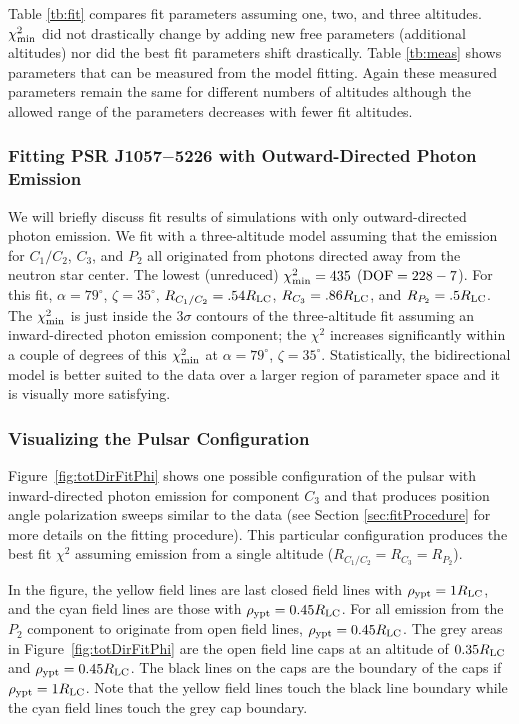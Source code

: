 Table \ref{tb:fit} compares fit parameters assuming one,
two, and three altitudes.  $\chi^2_{\rm{min}}$ did not drastically change
by adding new free parameters (additional altitudes) nor did
the best fit parameters shift drastically.  
Table \ref{tb:meas} shows parameters that can be measured
from the model fitting.  Again these measured parameters remain the
same for different numbers of altitudes although
the allowed range of the parameters decreases with
fewer fit altitudes.

\subsubsection{Fitting PSR J1057$-$5226 with Outward-Directed Photon Emission}
\label{sec:outwardOnly}
We will briefly discuss fit results of simulations with 
only outward-directed photon emission.  We 
fit with a three-altitude model assuming that
the emission for $C_1/C_2$, $C_3$, and $P_2$
all originated from photons directed away from the
neutron star center.
The lowest (unreduced) $\chi^2_{\rm{min}}=435$ ($\rm{DOF}=228-7$).
For this fit, $\alpha=79^\circ$, $\zeta=35^\circ$, $R_{C_1/C_2}=.54R_{\rm{LC}}$, $R_{C_3}=.86R_{\rm{LC}}$,
and $R_{P_2}=.5R_{\rm{LC}}$.  The $\chi^2_{\rm{min}}$ is just inside
the $3\sigma$ contours of the three-altitude fit assuming
an inward-directed photon emission component; the $\chi^2$
increases significantly within a couple of degrees of this $\chi^2_{\rm{min}}$
at $\alpha=79^\circ$, $\zeta=35^\circ$.
Statistically, the bidirectional model is
better suited to the data over a larger region of 
parameter space and it is visually more satisfying.

\subsubsection{Visualizing the Pulsar Configuration}
\label{sec:config}


Figure~\ref{fig:totDirFitPhi} shows one possible configuration
of the pulsar with inward-directed photon emission for component $C_3$
and that produces position angle polarization sweeps similar
to the data (see Section \ref{sec:fitProcedure} for more
details on the fitting procedure).  This particular configuration
produces the best fit $\chi^2$ assuming emission
from a single altitude ($R_{C_1/C_2}=R_{C_3}=R_{P_2}$).

In the figure, the yellow field lines are 
last closed field lines with $\rho_{\rm{ypt}}=1R_{\rm{LC}}$,
and the cyan field lines are those with $\rho_{\rm{ypt}}=0.45R_{\rm{LC}}$.
For all emission from the $P_2$ component to originate
from open field lines, $\rho_{\rm{ypt}}=0.45R_{\rm{LC}}$.  The grey areas in 
Figure~\ref{fig:totDirFitPhi} are the open field line 
caps at an altitude of $0.35R_{\rm{LC}}$ and $\rho_{\rm{ypt}}=0.45R_{\rm{LC}}$.
The black lines on the caps are the boundary of the caps if 
$\rho_{\rm{ypt}}=1R_{\rm{LC}}$.  Note that the yellow field lines
touch the black line boundary while the 
cyan field lines touch the grey cap boundary.

